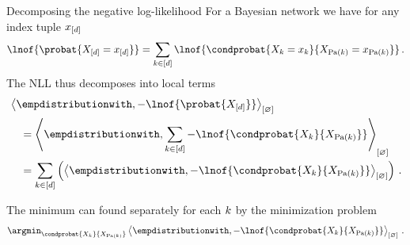 \documentclass{beamer}
\begin{document}
    \begin{frame}{Decomposing the negative log-likelihood}
        For a Bayesian network we have for any index tuple $x_{[d]}$
        \begin{align*}
            \lnof{\probat{\shortcatvariables=\shortcatindices}}
            = \sum_{\catenumeratorin}\lnof{\condprobat{\indexedcatvariableof{\catenumerator}}{\indexedcatvariableof{\parentsof{\catenumerator}}}} \, .
        \end{align*}
        The NLL thus decomposes into local terms
        \begin{align*}
            &\contraction{\empdistributionwith,-\lnof{\probat{\shortcatvariables}}} \\
            &\quad= \contraction{\empdistributionwith,\sum_{\catenumeratorin} -\lnof{\condprobat{\catvariableof{\catenumerator}}{\catvariableof{\parentsof{\catenumerator}}}}} \\
            &\quad= \sum_{\catenumeratorin}\left(\contraction{\empdistributionwith,-\lnof{\condprobat{\catvariableof{\catenumerator}}{\catvariableof{\parentsof{\catenumerator}}}}}\right) \,.
        \end{align*}

        The minimum can found separately for each $k$ by the minimization problem
        \begin{align*}
            \argmin_{\condprobat{\catvariableof{\catenumerator}}{\catvariableof{\parentsof{\catenumerator}}}}
            \contraction{\empdistributionwith,-\lnof{\condprobat{\catvariableof{\catenumerator}}{\catvariableof{\parentsof{\catenumerator}}}}} \, .
        \end{align*}
    \end{frame}
\end{document}
